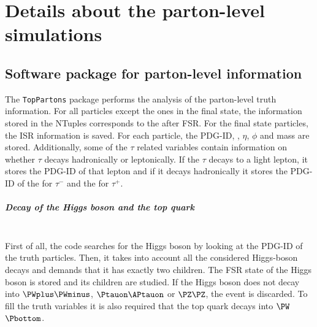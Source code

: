 \chapter{Details about the parton-level simulations}
\label{chap:Appendix:TopPartons}




\section{Software package for parton-level information}
\label{sec:ChaptH:Sig:truth:TopPartons}
The \texttt{TopPartons} package performs the analysis of the parton-level truth information.
For all particles except the ones in the final state, the information stored in the NTuples
corresponds to the after FSR. For the final state particles, the ISR information is saved.
For each particle, the PDG-ID, \pT, $\eta$, $\phi$ and mass are stored. Additionally, some of the $\tau$ related
variables contain information on whether $\tau$ decays hadronically or leptonically.  If the $\tau$ decays to a 
light lepton, it stores the PDG-ID of that lepton and if it decays hadronically
 it stores the PDG-ID of the \PWm for $\tau^-$ and the \PWp for $\tau^+$.


\paragraph{Decay of the Higgs boson and the top quark}\mbox{}\\
First of all, the code searches for the Higgs boson by looking at the PDG-ID of the truth 
particles. Then, it takes into account all the considered Higgs-boson decays 
and demands that it has exactly two children. 
The FSR state of the Higgs boson is stored and its children are studied.
If the Higgs boson does not decay into 
$\PWplus\PWminus$, $\Ptauon \APtauon$ or $\PZ\PZ$, the event is discarded. 
To fill the truth variables it is also required that the top quark decays into $\PW$$\Pbottom$.


